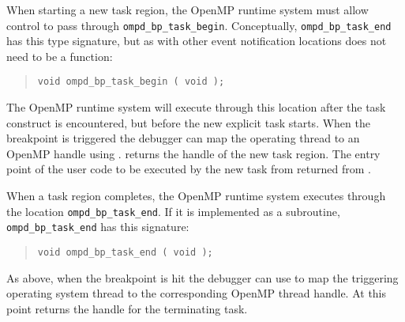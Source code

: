 When starting a new task region, the OpenMP runtime system
must allow control to pass through \texttt{ompd\_bp\_task\_begin}.
Conceptually, \texttt{ompd\_bp\_task\_end} has this type
signature, but as with other event notification locations 
does not need to be a function:
\begin{quote}
\begin{lstlisting}
void ompd_bp_task_begin ( void );
\end{lstlisting}
\end{quote}
The OpenMP runtime system will execute through this location after the task
construct is encountered, but before the new explicit task starts.
When the breakpoint is triggered the debugger can map the operating
thread to an OpenMP handle using
.
returns the handle of the new task region.
The entry point of the user code to be executed by the new task
from returned from
.

When a task region completes, the OpenMP runtime system
executes through the location \texttt{ompd\_bp\_task\_end}.
If it is implemented as a subroutine, \texttt{ompd\_bp\_task\_end}
has this signature:
\begin{quote}
\begin{lstlisting}
void ompd_bp_task_end ( void );
\end{lstlisting}
\end{quote}
As above, when the breakpoint is hit the debugger can use
to map the triggering operating system thread to the corresponding
OpenMP thread handle.
At this point
returns the handle for the terminating task.
